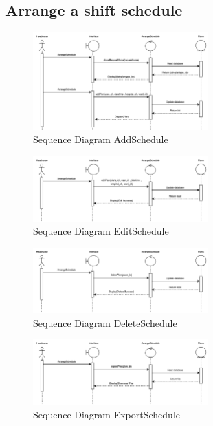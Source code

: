 \subsection{Arrange a shift schedule}

    \begin{figure}[h]
    \centering
    \includegraphics[width=0.6\textwidth]{Sequence 3.1.png}
    \caption{Sequence Diagram AddSchedule}
    \end{figure}

    \begin{figure}[h]
    \centering
    \includegraphics[width=0.6\textwidth]{Sequence 3.2.png}
    \caption{Sequence Diagram EditSchedule}
    \end{figure}

    \begin{figure}[h]
    \centering
    \includegraphics[width=0.6\textwidth]{Sequence 3.3.png}
    \caption{Sequence Diagram DeleteSchedule}
    \end{figure}

    \begin{figure}[h]
    \centering
    \includegraphics[width=0.6\textwidth]{Sequence 3.4.png}
    \caption{Sequence Diagram ExportSchedule}
    \end{figure}



